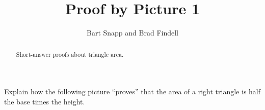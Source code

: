 \documentclass[nooutcomes,space,handout]{ximera}
\title{Proof by Picture 1}
\author{Bart Snapp and Brad Findell}
\begin{document}
\begin{abstract}
Short-answer proofs about triangle area. 
\end{abstract}
\maketitle


\begin{problem}
Explain how the following picture ``proves'' that
  the area of a right triangle is half the base times the height.
%
%
%
%
%

\end{problem}
\end{document}
